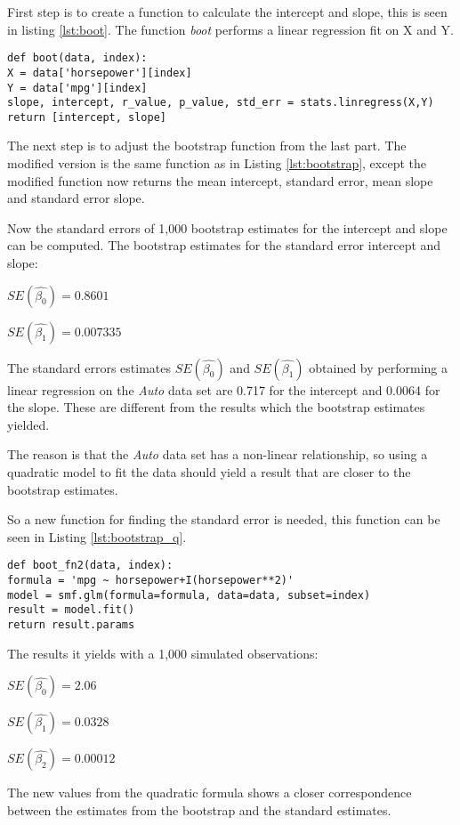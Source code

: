 First step is to create a function to calculate the intercept and slope, this is seen in listing \ref{lst:boot}. The function \emph{boot} performs a linear regression fit on X and Y. 

\begin{lstlisting}[caption={Boot function in python}, label=lst:boot, mathescape=true]
def boot(data, index):
X = data['horsepower'][index]
Y = data['mpg'][index]
slope, intercept, r_value, p_value, std_err = stats.linregress(X,Y)
return [intercept, slope]
\end{lstlisting}

The next step is to adjust the bootstrap function from the last part. The modified version is the same function as in Listing \ref{lst:bootstrap}, except the modified function now returns the mean intercept, standard error, mean slope and standard error slope.

Now the standard errors of 1,000 bootstrap estimates for the intercept and slope can be computed.
The bootstrap estimates for the standard error intercept and slope:

\begin{center}
	$SE(\hat{\beta_0}) = 0.8601$
\end{center} 
\begin{center}
	$SE(\hat{\beta_1}) = 0.007335$
\end{center}

The standard errors estimates $SE(\hat{\beta_0})$ and $SE(\hat{\beta_1})$ obtained by performing a linear regression on the \emph{Auto} data set are 0.717 for the intercept and 0.0064 for the slope. These are different from the results which the bootstrap estimates yielded.

The reason is that the \emph{Auto} data set has a non-linear relationship, so using a quadratic model to fit the data should yield a result that are closer to the bootstrap estimates.

So a new function for finding the standard error is needed, this function can be seen in Listing \ref{lst:bootstrap_q}.

\begin{lstlisting}[caption={Function to calculate standard error with a qudratic model}, label=lst:bootstrap_q, mathescape=true]
def boot_fn2(data, index):
formula = 'mpg ~ horsepower+I(horsepower**2)'
model = smf.glm(formula=formula, data=data, subset=index)
result = model.fit()
return result.params
\end{lstlisting}

The results it yields with a 1,000 simulated observations:

\begin{center}
	$SE(\hat{\beta_0}) = 2.06$
\end{center}
\begin{center}
	$SE(\hat{\beta_1}) = 0.0328$
\end{center}
\begin{center}
	$SE(\hat{\beta_2}) = 0.00012$
\end{center}

The new values from the quadratic formula shows a closer correspondence between the estimates from the bootstrap and the standard estimates.